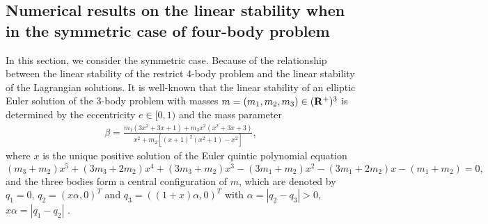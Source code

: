 \documentclass[11pt]{article}
\def\be{\begin{equation}}
\def\ee{\end{equation}}
\def\lb{\label}
\def\R{{\bf R}}
\def\aa{{\alpha}}
\def\bb{{\beta}}
\begin{document}
  



\subsection{Numerical results on the linear stability when 
in the symmetric case of four-body problem}
\label{subsec:3.2}
In this section, we consider the symmetric case. 
Because of the relationship between the linear stability of the restrict 4-body problem and the linear stability of the Lagrangian solutions. 
It is well-known that the linear stability of an elliptic Euler solution
of the $3$-body problem with masses $m=(m_1,m_2,m_3)\in (\R^+)^3$ is determined by the
eccentricity $e\in [0,1)$ and the mass parameter
\begin{align}\lb{1.4}
  \bb = \frac{m_1(3x^2+3x+1)+m_3x^2(x^2+3x+3)}{x^2+m_2[(x+1)^2(x^2+1)-x^2]},
\end{align}
where $x$ is the unique positive solution of the Euler quintic polynomial equation
\be (m_3+m_2)x^5+(3m_3+2m_2)x^4+(3m_3+m_2)x^3-(3m_1+m_2)x^2-(3m_1+2m_2)x-(m_1+m_2)=0, \lb{Euler.quintic.polynomial}
\ee
and the three bodies form a central configuration of $m$, which are denoted by $q_1=0$,
$q_2=(x\alpha,0)^T$ and $q_3=((1+x)\alpha,0)^T$ with $\alpha=|q_2-q_3|>0$, $x\alpha=|q_1-q_2|$ \cite{Zhou2017}.
\end{document}
